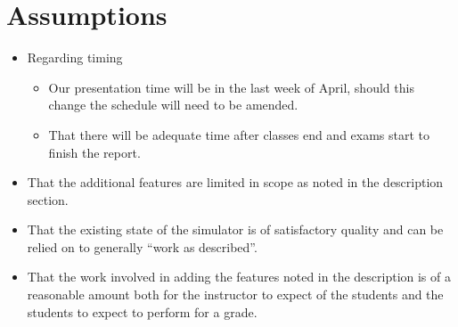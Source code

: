 \documentclass{article}
\begin{document}
\section{Assumptions}

\begin{itemize}
\item Regarding timing
  \begin{itemize}
  \item Our presentation time will be in the last week of April,
    should this change the schedule will need to be amended.
  \item That there will be adequate time after classes end and exams
    start to finish the report.
  \end{itemize}
\item That the additional features are limited in scope as noted in
  the description section.

\item That the existing state of the simulator is of satisfactory
  quality and can be relied on to generally “work as described”.

\item That the work involved in adding the features noted in the
  description is of a reasonable amount both for the instructor to
  expect of the students and the students to expect to perform for a
  grade.
\end{itemize}
\end{document}
